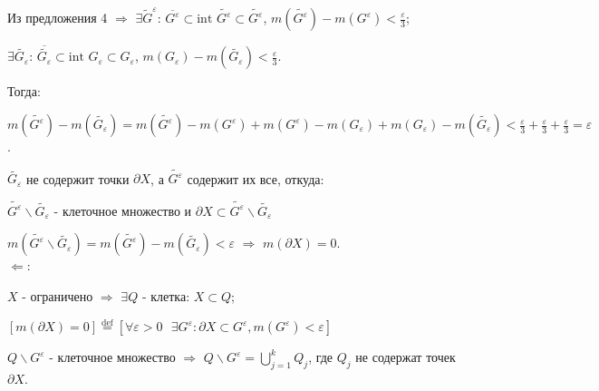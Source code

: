 \documentclass[a4paper,12pt]{article} %
\begin{document}
Из предложения 4 $\Rightarrow$ $\exists \widetilde{G}^{\varepsilon}$: $\overline{G^{\varepsilon}} \subset \text{int } \widetilde{G^{\varepsilon}} \subset \widetilde{G^{\varepsilon}}$, $m(\widetilde{G^{\varepsilon}}) - m(G^{\varepsilon}) < \frac{\varepsilon}{3}$;

$\exists \widetilde{G_{\varepsilon}}$: $\overline{\widetilde{G_{\varepsilon}}} \subset \text{int } G_{\varepsilon} \subset G_{\varepsilon}$, $m(G_{\varepsilon}) - m(\widetilde{G_{\varepsilon}}) < \frac{\varepsilon}{3}$.

\vspace{2mm}

Тогда: 

$m(\widetilde{G^{\varepsilon}}) - m(\widetilde{G_{\varepsilon}}) = m(\widetilde{G^{\varepsilon}}) - m(G^{\varepsilon}) + m(G^{\varepsilon}) - m(G_{\varepsilon}) + m(G_{\varepsilon}) - m(\widetilde{G_{\varepsilon}}) < \frac{\varepsilon}{3} + \frac{\varepsilon}{3} + \frac{\varepsilon}{3}  = \varepsilon$.

\vspace{2mm}

$\widetilde{G_{\varepsilon}}$ не содержит точки $\partial X$, а $\widetilde{G^{\varepsilon}}$ содержит их все, откуда:

$\widetilde{G^{\varepsilon}} \backslash \widetilde{G_{\varepsilon}}$ - клеточное множество и $\partial X \subset \widetilde{G^{\varepsilon}} \backslash \widetilde{G_{\varepsilon}}$

$m(\widetilde{G^{\varepsilon}} \backslash \widetilde{G_{\varepsilon}}) = m(\widetilde{G^{\varepsilon}}) - m(\widetilde{G_{\varepsilon}}) < \varepsilon$ $\Rightarrow$ $m(\partial X) = 0$.\\


$\Longleftarrow$:

$X$ - ограничено $\Rightarrow$ $\exists Q$ - клетка: $X \subset Q$;

\vspace{2mm}

$\left[m(\partial X) = 0\right] \stackrel{\text{def}}{=} \left[\forall \varepsilon > 0 \text{ } \exists G^{\varepsilon}: \partial X \subset G^{\varepsilon}, m(G^{\varepsilon}) < \varepsilon\right]$ 

\vspace{2mm}

$Q \backslash G^{\varepsilon}$ - клеточное множество $\Rightarrow$ $ Q \backslash G^{\varepsilon} = \bigcup\limits_{j = 1}^k Q_j$, \hspace{7mm} где $Q_j$ не содержат точек $\partial X$.
\end{document}
